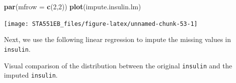 \documentclass[
]{book}
\newenvironment{Shaded}{\begin{snugshade}}{\end{snugshade}}
\newcommand{\AttributeTok}[1]{\textcolor[rgb]{0.13,0.29,0.53}{#1}}
\newcommand{\ConstantTok}[1]{\textcolor[rgb]{0.56,0.35,0.01}{#1}}
\newcommand{\ControlFlowTok}[1]{\textcolor[rgb]{0.13,0.29,0.53}{\textbf{#1}}}
\newcommand{\DecValTok}[1]{\textcolor[rgb]{0.00,0.00,0.81}{#1}}
\newcommand{\FunctionTok}[1]{\textcolor[rgb]{0.13,0.29,0.53}{\textbf{#1}}}
\newcommand{\NormalTok}[1]{#1}
\newcommand{\OtherTok}[1]{\textcolor[rgb]{0.56,0.35,0.01}{#1}}
\newcommand{\SpecialCharTok}[1]{\textcolor[rgb]{0.81,0.36,0.00}{\textbf{#1}}}
\begin{document}
\begin{Shaded}
\begin{Highlighting}[]
\FunctionTok{par}\NormalTok{(}\AttributeTok{mfrow =} \FunctionTok{c}\NormalTok{(}\DecValTok{2}\NormalTok{,}\DecValTok{2}\NormalTok{))}
\FunctionTok{plot}\NormalTok{(impute.insulin.lm)}
\end{Highlighting}
\end{Shaded}

\begin{center}\texttt{[image: STA551EB\_files/figure-latex/unnamed-chunk-53-1]} \end{center}

Next, we use the following linear regression to impute the missing values in \texttt{insulin}.

\begin{Shaded}
\end{Shaded}

Visual comparison of the distribution between the original \texttt{insulin} and the imputed \texttt{insulin}.
\end{document}
